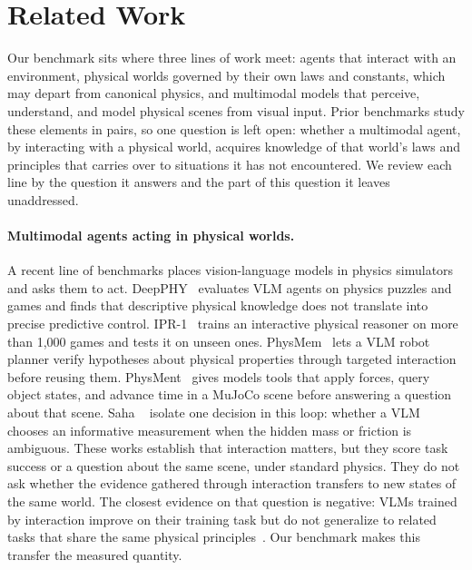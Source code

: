 \section{Related Work}
\label{sec:related}

Our benchmark sits where three lines of work meet: agents that interact with an environment, physical worlds governed by their own laws and constants, which may depart from canonical physics, and multimodal models that perceive, understand, and model physical scenes from visual input. Prior benchmarks study these elements in pairs, so one question is left open: whether a multimodal agent, by interacting with a physical world, acquires knowledge of that world's laws and principles that carries over to situations it has not encountered. We review each line by the question it answers and the part of this question it leaves unaddressed.

\paragraph{Multimodal agents acting in physical worlds.} A recent line of benchmarks places vision-language models in physics simulators and asks them to act. DeepPHY~\cite{deepphy} evaluates VLM agents on physics puzzles and games and finds that descriptive physical knowledge does not translate into precise predictive control. IPR-1~\cite{ipr1} trains an interactive physical reasoner on more than 1,000 games and tests it on unseen ones. PhysMem~\cite{physmem} lets a VLM robot planner verify hypotheses about physical properties through targeted interaction before reusing them. PhysMent~\cite{physment} gives models tools that apply forces, query object states, and advance time in a MuJoCo scene before answering a question about that scene. Saha \etal~\cite{newevidence} isolate one decision in this loop: whether a VLM chooses an informative measurement when the hidden mass or friction is ambiguous. These works establish that interaction matters, but they score task success or a question about the same scene, under standard physics. They do not ask whether the evidence gathered through interaction transfers to new states of the same world. The closest evidence on that question is negative: VLMs trained by interaction improve on their training task but do not generalize to related tasks that share the same physical principles~\cite{schulzebuschoff2026}. Our benchmark makes this transfer the measured quantity.

